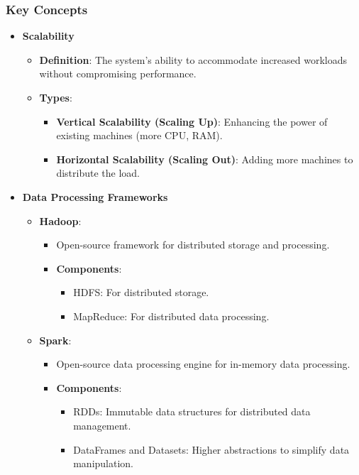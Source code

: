 \documentclass{beamer}
\begin{document}
\begin{frame}[fragile]
    \frametitle{Key Concepts}
    \begin{itemize}
        \item \textbf{Scalability}
            \begin{itemize}
                \item \textbf{Definition}: The system's ability to accommodate increased workloads without compromising performance.
                \item \textbf{Types}:
                    \begin{itemize}
                        \item \textbf{Vertical Scalability (Scaling Up)}: Enhancing the power of existing machines (more CPU, RAM).
                        \item \textbf{Horizontal Scalability (Scaling Out)}: Adding more machines to distribute the load.
                    \end{itemize}
            \end{itemize}
        \item \textbf{Data Processing Frameworks}
            \begin{itemize}
                \item \textbf{Hadoop}: 
                    \begin{itemize}
                        \item Open-source framework for distributed storage and processing.
                        \item \textbf{Components}:
                            \begin{itemize}
                                \item HDFS: For distributed storage.
                                \item MapReduce: For distributed data processing.
                            \end{itemize}
                    \end{itemize}
                \item \textbf{Spark}: 
                    \begin{itemize}
                        \item Open-source data processing engine for in-memory data processing.
                        \item \textbf{Components}:
                            \begin{itemize}
                                \item RDDs: Immutable data structures for distributed data management.
                                \item DataFrames and Datasets: Higher abstractions to simplify data manipulation.
                            \end{itemize}
                    \end{itemize}
            \end{itemize}
    \end{itemize}
\end{frame}
\end{document}
